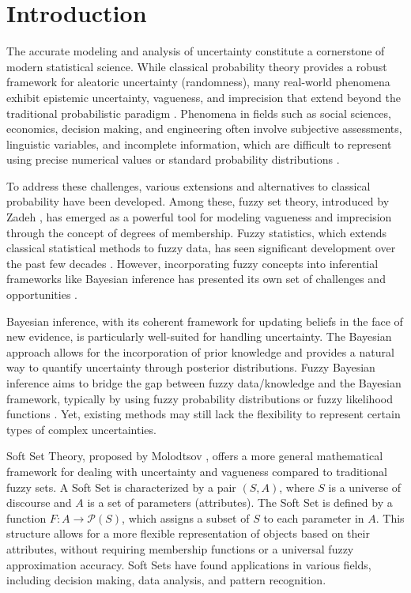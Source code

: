 \documentclass[twoside]{article}
\begin{document}
\section{Introduction} \label{sec:introduction}

The accurate modeling and analysis of uncertainty constitute a cornerstone of modern statistical science. While classical probability theory provides a robust framework for aleatoric uncertainty (randomness), many real-world phenomena exhibit epistemic uncertainty, vagueness, and imprecision that extend beyond the traditional probabilistic paradigm \cite{zadeh:1965}. Phenomena in fields such as social sciences, economics, decision making, and engineering often involve subjective assessments, linguistic variables, and incomplete information, which are difficult to represent using precise numerical values or standard probability distributions \cite{bezdek:2001}.

To address these challenges, various extensions and alternatives to classical probability have been developed. Among these, fuzzy set theory, introduced by Zadeh \cite{zadeh:1965}, has emerged as a powerful tool for modeling vagueness and imprecision through the concept of degrees of membership. Fuzzy statistics, which extends classical statistical methods to fuzzy data, has seen significant development over the past few decades \cite{kaufmann:1987}. However, incorporating fuzzy concepts into inferential frameworks like Bayesian inference has presented its own set of challenges and opportunities \cite{denoeux:1999}.

Bayesian inference, with its coherent framework for updating beliefs in the face of new evidence, is particularly well-suited for handling uncertainty. The Bayesian approach allows for the incorporation of prior knowledge and provides a natural way to quantify uncertainty through posterior distributions. Fuzzy Bayesian inference aims to bridge the gap between fuzzy data/knowledge and the Bayesian framework, typically by using fuzzy probability distributions or fuzzy likelihood functions \cite{aguilar:2002}. Yet, existing methods may still lack the flexibility to represent certain types of complex uncertainties.

Soft Set Theory, proposed by Molodtsov \cite{molodtsov:1999}, offers a more general mathematical framework for dealing with uncertainty and vagueness compared to traditional fuzzy sets. A Soft Set is characterized by a pair $(S, A)$, where $S$ is a universe of discourse and $A$ is a set of parameters (attributes). The Soft Set is defined by a function $F: A \to \mathcal{P}(S)$, which assigns a subset of $S$ to each parameter in $A$. This structure allows for a more flexible representation of objects based on their attributes, without requiring membership functions or a universal fuzzy approximation accuracy. Soft Sets have found applications in various fields, including decision making, data analysis, and pattern recognition.
\end{document}
